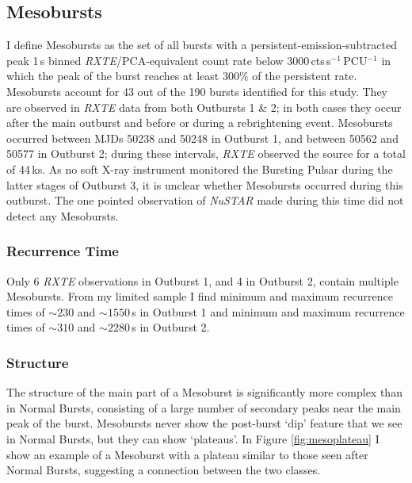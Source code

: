 \subsection{Mesobursts}

\par I define Mesobursts as the set of all bursts with a persistent-emission-subtracted peak 1\,s binned \textit{RXTE}/PCA-equivalent count rate below 3000\,cts\,s$^{-1}$\,PCU$^{-1}$ in which the peak of the burst reaches at least $300\%$ of the persistent rate.  Mesobursts account for 43 out of the 190 bursts identified for this study.  They are observed in \textit{RXTE} data from both Outbursts 1 \& 2; in both cases they occur after the main outburst and before or during a rebrightening event.  Mesobursts occurred between MJDs 50238 and 50248 in Outburst 1, and between 50562 and 50577 in Outburst 2; during these intervals, \textit{RXTE} observed the source for a total of 44\,ks.  As no soft X-ray instrument monitored the Bursting Pulsar during the latter stages of Outburst 3, it is unclear whether Mesobursts occurred during this outburst.  The one pointed observation of \textit{NuSTAR} made during this time did not detect any Mesobursts.

\subsubsection{Recurrence Time}

\par Only 6 \textit{RXTE} observations in Outburst 1, and 4 in Outburst 2, contain multiple Mesobursts.  From my limited sample I find minimum and maximum recurrence times of $\sim230$ and $\sim1550$\,s in Outburst 1 and minimum and maximum recurrence times of $\sim310$ and $\sim2280$\,s in Outburst 2.

\subsubsection{Structure}

\par The structure of the main part of a Mesoburst is significantly more complex than in Normal Bursts, consisting of a large number of secondary peaks near the main peak of the burst.  Mesobursts never show the post-burst `dip' feature that we see in Normal Bursts, but they can show `plateaus'.  In Figure \ref{fig:mesoplateau} I show an example of a Mesoburst with a plateau similar to those seen after Normal Bursts, suggesting a connection between the two classes.

